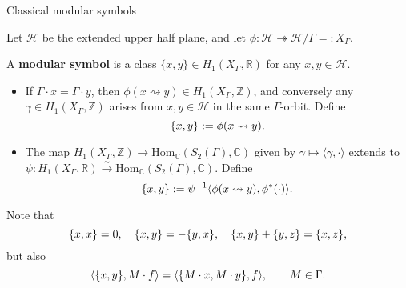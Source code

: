 \documentclass[10pt]{beamer}
\begin{document}
\begin{frame}[t]{Classical modular symbols}

Let $ \mathcal{H} $ be the extended upper half plane, and let $ \phi : \mathcal{H} \twoheadrightarrow \mathcal{H} / \Gamma =: X_\Gamma $.

\pause

\vspace{0.5cm} A \textbf{modular symbol} is a class $ \{x, y\} \in H_1(X_\Gamma, \mathbb{R}) $ for any $ x, y \in \mathcal{H} $.

\pause

\begin{itemize}
\item If $ \Gamma \cdot x = \Gamma \cdot y $, then $ \phi(x \rightsquigarrow y) \in H_1(X_\Gamma, \mathbb{Z}) $, and conversely any $ \gamma \in H_1(X_\Gamma, \mathbb{Z}) $ arises from $ x, y \in \mathcal{H} $ in the same $ \Gamma $-orbit. Define
\vspace{-0.2cm} $$ \vspace{-0.2cm} \{x, y\} := \phi(x \rightsquigarrow y). $$

\pause

\item The map $ H_1(X_\Gamma, \mathbb{Z}) \to \mathrm{Hom}_\mathbb{C}(S_2(\Gamma), \mathbb{C}) $ given by $ \gamma \mapsto \langle\gamma, \cdot\rangle $ extends to $ \psi : H_1(X_\Gamma, \mathbb{R}) \xrightarrow{\sim} \mathrm{Hom}_\mathbb{C}(S_2(\Gamma), \mathbb{C}) $. Define
\vspace{-0.2cm} $$ \vspace{-0.2cm} \{x, y\} := \psi^{-1}\langle\phi(x \rightsquigarrow y), \phi^*(\cdot)\rangle. $$
\end{itemize}

\pause

Note that
\vspace{-0.2cm} $$ \vspace{-0.2cm} \{x, x\} = 0, \quad \{x, y\} = -\{y, x\}, \quad \{x, y\} + \{y, z\} = \{x, z\}, $$
but also
\vspace{-0.2cm} $$ \vspace{-0.2cm} \langle\{x, y\}, M \cdot f\rangle = \langle\{M \cdot x, M \cdot y\}, f\rangle, \qquad M \in \Gamma. $$

\end{frame}
\end{document}

